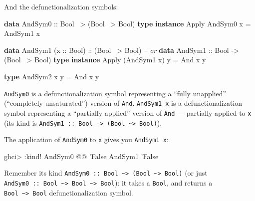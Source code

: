 \documentclass[]{article}
\newenvironment{Shaded}{}{}
\newcommand{\CommentTok}[1]{\textcolor[rgb]{0.38,0.63,0.69}{\textit{#1}}}
\newcommand{\DataTypeTok}[1]{\textcolor[rgb]{0.56,0.13,0.00}{#1}}
\newcommand{\FunctionTok}[1]{\textcolor[rgb]{0.02,0.16,0.49}{#1}}
\newcommand{\KeywordTok}[1]{\textcolor[rgb]{0.00,0.44,0.13}{\textbf{#1}}}
\newcommand{\NormalTok}[1]{#1}
\newcommand{\OtherTok}[1]{\textcolor[rgb]{0.00,0.44,0.13}{#1}}
\begin{document}
And the defunctionalization symbols:

\begin{Shaded}
\begin{Highlighting}[]
\KeywordTok{data} \DataTypeTok{AndSym0}\OtherTok{ ::} \DataTypeTok{Bool} \FunctionTok{~>}\NormalTok{ (}\DataTypeTok{Bool} \FunctionTok{~>} \DataTypeTok{Bool}\NormalTok{)}
\KeywordTok{type} \KeywordTok{instance} \DataTypeTok{Apply} \DataTypeTok{AndSym0}\NormalTok{ x }\FunctionTok{=} \DataTypeTok{AndSym1}\NormalTok{ x}

\KeywordTok{data} \DataTypeTok{AndSym1}\NormalTok{ (}\OtherTok{x ::} \DataTypeTok{Bool}\NormalTok{)}\OtherTok{ ::}\NormalTok{ (}\DataTypeTok{Bool} \FunctionTok{~>} \DataTypeTok{Bool}\NormalTok{)}
\CommentTok{-- or}
\KeywordTok{data} \DataTypeTok{AndSym1}\OtherTok{ ::} \DataTypeTok{Bool} \OtherTok{->}\NormalTok{ (}\DataTypeTok{Bool} \FunctionTok{~>} \DataTypeTok{Bool}\NormalTok{)}
\KeywordTok{type} \KeywordTok{instance} \DataTypeTok{Apply}\NormalTok{ (}\DataTypeTok{AndSym1}\NormalTok{ x) y }\FunctionTok{=} \DataTypeTok{And}\NormalTok{ x y}

\KeywordTok{type} \DataTypeTok{AndSym2}\NormalTok{ x y }\FunctionTok{=} \DataTypeTok{And}\NormalTok{ x y}
\end{Highlighting}
\end{Shaded}

\texttt{AndSym0} is a defunctionalization symbol representing a ``fully
unapplied'' (``completely unsaturated'') version of \texttt{And}.
\texttt{AndSym1\ x} is a defunctionalization symbol representing a ``partially
applied'' version of \texttt{And} --- partially applied to \texttt{x} (its kind
is
\texttt{AndSym1\ ::\ Bool\ -\textgreater{}\ (Bool\ \textasciitilde{}\textgreater{}\ Bool)}).

The application of \texttt{AndSym0} to \texttt{x} gives you \texttt{AndSym1\ x}:

\begin{Shaded}
\begin{Highlighting}[]
\NormalTok{ghci}\FunctionTok{>} \FunctionTok{:}\NormalTok{kind}\FunctionTok{!} \DataTypeTok{AndSym0} \FunctionTok{@@}\NormalTok{ '}\DataTypeTok{False}
\DataTypeTok{AndSym1}\NormalTok{ '}\DataTypeTok{False}
\end{Highlighting}
\end{Shaded}

Remember its kind
\texttt{AndSym0\ ::\ Bool\ \textasciitilde{}\textgreater{}\ (Bool\ \textasciitilde{}\textgreater{}\ Bool)}
(or just
\texttt{AndSym0\ ::\ Bool\ \textasciitilde{}\textgreater{}\ Bool\ \textasciitilde{}\textgreater{}\ Bool}):
it takes a \texttt{Bool}, and returns a
\texttt{Bool\ \textasciitilde{}\textgreater{}\ Bool} defunctionalization symbol.
\end{document}
